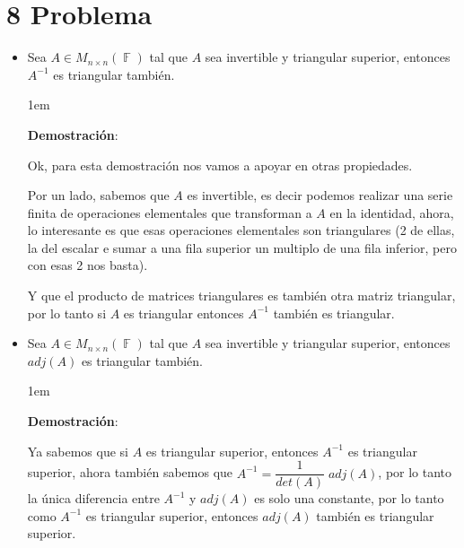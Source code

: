 \documentclass[12pt, fleqn]{article}                             %
\newenvironment{SmallIndentation}[1][0.75em]                    %
        {\begin{adjustwidth}{#1}{}\begin{footnotesize}}             %
        {\end{footnotesize}\end{adjustwidth}}                       %
\theoremstyle{break}                                            %
\DeclareMathOperator \GenericField {\mathbb{F}}                 %
\begin{document}
\clearpage
\section{8 Problema}
    
    \begin{itemize}

        \item
            Sea $A \in M_{n \times n}(\GenericField)$ tal que $A$ sea invertible y triangular superior, 
            entonces $A^{-1}$ es triangular también.

            \begin{SmallIndentation}[1em]
                \textbf{Demostración}:
                
                Ok, para esta demostración nos vamos a apoyar en otras propiedades.

                Por un lado, sabemos que $A$ es invertible, es decir podemos realizar una serie finita de operaciones
                elementales que transforman a $A$ en la identidad, ahora, lo interesante es que esas operaciones elementales
                son triangulares (2 de ellas, la del escalar e sumar a una fila superior un multiplo de una fila inferior,
                pero con esas 2 nos basta).

                Y que el producto de matrices triangulares es también otra matriz triangular, por lo tanto si $A$ es triangular
                entonces $A^{-1}$ también es triangular.
            
            \end{SmallIndentation}

        \item
            Sea $A \in M_{n \times n}(\GenericField)$ tal que $A$ sea invertible y triangular superior, 
            entonces $adj(A)$ es triangular también.

            \begin{SmallIndentation}[1em]
                \textbf{Demostración}:
                
                Ya sabemos que si $A$ es triangular superior, entonces $A^{-1}$ es triangular superior, ahora
                también sabemos que $A^{-1} = \dfrac{1}{det(A)} \; adj(A)$, por lo tanto
                la única diferencia entre $A^{-1}$ y $adj(A)$ es solo una constante, por lo tanto
                como $A^{-1}$ es triangular superior, entonces $adj(A)$ también es triangular superior.
            
            \end{SmallIndentation}


    \end{itemize}
\end{document}
